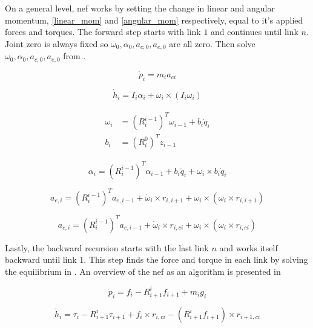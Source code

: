 On a general level, \gls{nef} works by setting the change in linear and angular momentum, \eqref{linear_mom} and \eqref{angular_mom} respectively, equal to it's applied forces and torques. The forward step starts with link $1$ and continues until link $n$. Joint zero is always fixed so $\omega_0, \alpha_0, a_{c;0}, a_{e,0}$ are all zero. Then solve $\omega_0, \alpha_0, a_{c;0}, a_{e,0}$ from .

\begin{equation}\label{linear_mom}
\dot{p}_i = m_i a_{ci}
\end{equation}

\begin{equation}\label{angular_mom}
\dot{h}_i = I_i \alpha_i + \omega_i \times \left ( I_i \omega_i \right )
\end{equation}

\begin{align}\label{omega}
\begin{split}
\omega_i &= \left ( R^{i-1}_i \right )^T\omega_{i-1} + b_i\dot{q}_i\\
b_i &= \left ( R^0_i \right )^T z_{i-1}
\end{split}
\end{align}

\begin{equation}\label{alpha}
\alpha_i = \left ( R^{i-1}_i \right )^T\alpha_{i-1} + b_i\ddot{q}_i+\omega_i \times b_i\dot{q}_i
\end{equation}

\begin{equation}\label{a_end}
a_{e,i} = \left ( R^{i-1}_i \right )^T a_{e,i-1} + \dot{\omega}_i \times r_{i,i+1}+\omega_i \times \left ( \omega_i \times r_{i,i+1} \right )
\end{equation}

\begin{equation}\label{a_center}
a_{c,i} = \left ( R^{i-1}_i \right )^T a_{e,i-1} + \dot{\omega}_i \times r_{i,ci}+\omega_i \times \left ( \omega_i \times r_{i,ci} \right )
\end{equation}

Lastly, the backward recursion starts with the last link $n$ and works itself backward until link 1. This step finds the force and torque in each link by solving the equilibrium in . An overview of the \gls{nef} as an algorithm is presented in 

\begin{equation}\label{linear_equi}
\dot{p}_i = f_i - R^i_{i+1} f_{i+1} + m_i g_i
\end{equation}

\begin{equation}\label{angular_equi}
\dot{h}_i = \tau_i - R^i_{i+1}\tau_{i+1} + f_i \times r_{i,ci}-\left ( R^i_{i+1}f_{i+1} \right ) \times r_{i+1,ci}
\end{equation}






